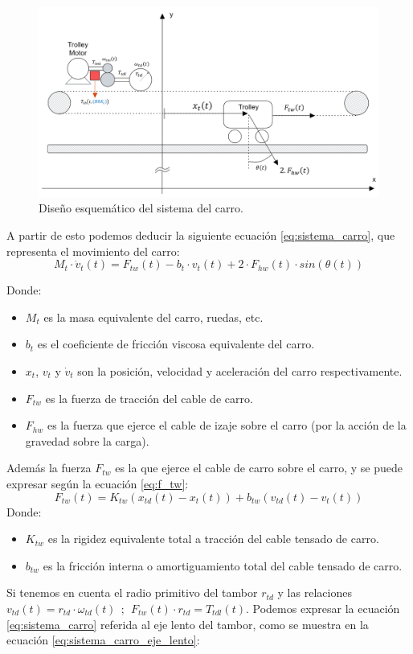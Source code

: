 \documentclass[11pt]{article}
\begin{document}
\begin{figure}[h!]
	\centering
	\includegraphics[width=1\textwidth]{images/imagen_2_sistema_carro.png}
	\caption{\label{fig:sistema_carro} Diseño esquemático del sistema del carro.}
\end{figure}
\newpage
A partir de esto podemos deducir la siguiente ecuación \ref{eq:sistema_carro}, que representa el movimiento del carro:
\begin{equation}
	\label{eq:sistema_carro}
	M_{t}\cdot\dot{v}_{t}(t)=F_{tw}(t)-b_{t}\cdot v_{t}(t)+2\cdot F_{hw}(t)\cdot sin(\theta(t))
\end{equation}

Donde:
\begin{itemize}
	\item $M_{t}$ es la masa equivalente del carro, ruedas, etc.
	\item $b_{t}$ es el coeficiente de fricción viscosa equivalente del carro.
	\item $x_{t}$, $v_{t}$ y $\dot{v}_{t}$ son la posición, velocidad y aceleración del carro respectivamente.
	\item $F_{tw}$ es la fuerza de tracción del cable de carro.
	\item $F_{hw}$ es la fuerza que ejerce el cable de izaje sobre el carro (por la acción de la gravedad sobre la carga).
\end{itemize}

Además la fuerza $F_{tw}$ es la que ejerce el cable de carro sobre el carro, y se puede expresar según la ecuación \ref{eq:f_tw}:
\begin{equation}
	\label{eq:f_tw}
	F_{tw}(t)=K_{tw}\left ( x_{td}(t) - x_{t}(t) \right ) + b_{tw}\left ( v_{td}(t) - v_{t}(t) \right )
\end{equation}
Donde:
\begin{itemize}
	\item $K_{tw}$ es la rigidez equivalente total a tracción del cable tensado de carro.
	\item $b_{tw}$ es la fricción interna o amortiguamiento total del cable tensado de carro.
\end{itemize}
Si tenemos en cuenta el radio primitivo del tambor $r_{td}$ y las relaciones $v_{td}(t)=r_{td}\cdot\omega_{td}(t)\ \ ;\ \ F_{tw}(t)\cdot r_{td} = T_{tdl}(t)$. Podemos expresar la ecuación \ref{eq:sistema_carro} referida al eje lento del tambor, como se muestra en la ecuación \ref{eq:sistema_carro_eje_lento}:
\end{document}
